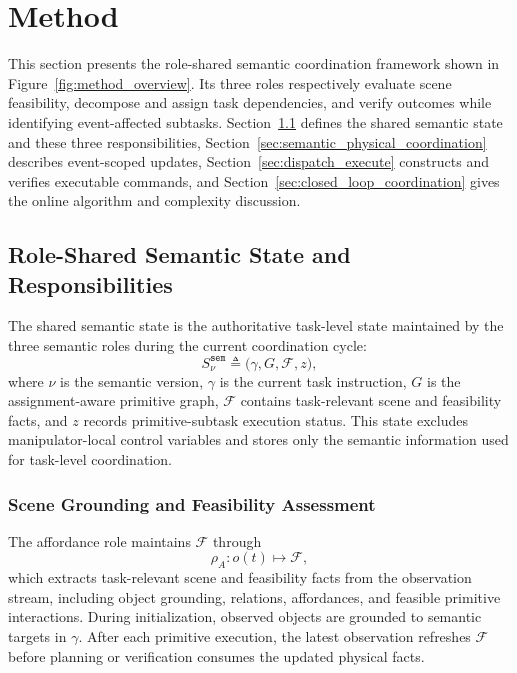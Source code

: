 \section{Method}
\label{sec:proposed_solution}

This section presents the role-shared semantic coordination framework shown in
Figure~\ref{fig:method_overview}. Its three roles respectively evaluate scene
feasibility, decompose and assign task dependencies, and verify outcomes while
identifying event-affected subtasks. Section~\ref{sec:role_shared_coordination}
defines the shared semantic state and these three responsibilities,
Section~\ref{sec:semantic_physical_coordination} describes event-scoped
updates, Section~\ref{sec:dispatch_execute} constructs and verifies executable
commands, and Section~\ref{sec:closed_loop_coordination} gives the online
algorithm and complexity discussion.

\subsection{Role-Shared Semantic State and Responsibilities}
\label{sec:role_shared_coordination}

The shared semantic state is the authoritative task-level state maintained by
the three semantic roles during the current coordination cycle:
\begin{equation}
 S_\nu^{\texttt{sem}}\triangleq
 \bigl(\gamma,G,\mathcal{F},z\bigr),
 \label{eq:semantic_state}
\end{equation}
where $\nu$ is the semantic version, $\gamma$ is the current task instruction,
$G$ is the assignment-aware primitive graph,
$\mathcal{F}$ contains task-relevant scene and feasibility facts, and $z$
records primitive-subtask execution status. This state excludes
manipulator-local control variables and stores only the semantic information
used for task-level coordination.

\subsubsection{Scene Grounding and Feasibility Assessment}
The affordance role maintains $\mathcal{F}$ through
\begin{equation*}
 \rho_A:o(t)\mapsto\mathcal{F},
\end{equation*}
which  extracts task-relevant scene and
feasibility facts from the observation stream, including object grounding,
relations, affordances, and feasible primitive interactions. During
initialization, observed objects are grounded to semantic targets in
$\gamma$. After each primitive execution, the latest observation refreshes
$\mathcal{F}$ before planning or verification consumes the updated physical
facts.

